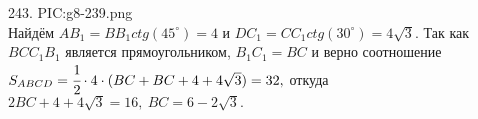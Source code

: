 243. {{PIC:g8-239.png}}\\
Найдём $AB_1=BB_1 ctg(45^\circ)=4$ и $DC_1=CC_1 ctg(30^\circ)=4\sqrt{3}.$ Так как $BCC_1B_1$ является прямоугольником, $B_1C_1=BC$ и верно соотношение
$S_{ABCD}=\cfrac{1}{2}\cdot4\cdot(BC+BC+4+4\sqrt{3})=32,$ откуда $2BC+4+4\sqrt{3}=16,\ BC=6-2\sqrt{3}.$\\
